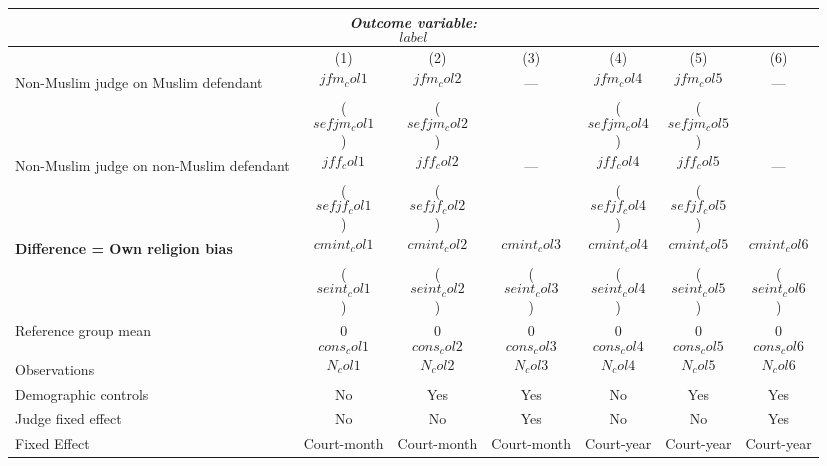 {
\def\sym#1{\ifmmode^{#1}\else\(^{#1}\)\fi}
\begin{tabular}{l*{6}{c}}
  \hline\hline
\multicolumn{7}{c}{\textit{Outcome variable: $$label$$}}\\
\hline
&\multicolumn{1}{c}{(1)}&\multicolumn{1}{c}{(2)}&\multicolumn{1}{c}{(3)}&\multicolumn{1}{c}{(4)}&\multicolumn{1}{c}{(5)}&\multicolumn{1}{c}{(6)}\\
\hline
Non-Muslim judge on Muslim defendant \hspace{15mm}& $$jfm_col1$$ & $$jfm_col2$$ & --- & $$jfm_col4$$ & $$jfm_col5$$ & --- \\
& ($$sefjm_col1$$) & ($$sefjm_col2$$) &  & ($$sefjm_col4$$) &($$sefjm_col5$$) &  \\
Non-Muslim judge on non-Muslim defendant \hspace{15mm}& $$jff_col1$$ & $$jff_col2$$ & ---& $$jff_col4$$ & $$jff_col5$$ & --- \\
& ($$sefjf_col1$$) & ($$sefjf_col2$$) &  & ($$sefjf_col4$$) & ($$sefjf_col5$$) &  \\
\textbf{Difference = Own religion bias} & $$cmint_col1$$ & $$cmint_col2$$ & $$cmint_col3$$ & $$cmint_col4$$ & $$cmint_col5$$ & $$cmint_col6$$ \\
& ($$seint_col1$$) & ($$seint_col2$$) & ($$seint_col3$$) & ($$seint_col4$$) & ($$seint_col5$$) & ($$seint_col6$$) \\
\hline
Reference group mean & 0$$cons_col1$$ & 0$$cons_col2$$ & 0$$cons_col3$$ & 0$$cons_col4$$ & 0$$cons_col5$$ & 0$$cons_col6$$ \\
Observations & $$N_col1$$ & $$N_col2$$ & $$N_col3$$ & $$N_col4$$ & $$N_col5$$ & $$N_col6$$ \\
Demographic controls & No & Yes & Yes & No & Yes & Yes \\
Judge fixed effect & No & No & Yes & No & No & Yes \\
Fixed Effect & Court-month & Court-month & Court-month & Court-year & Court-year & Court-year \\
\hline\hline
\end{tabular}
}
 
